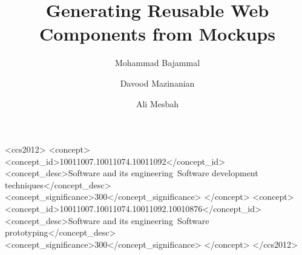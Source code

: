 \documentclass[sigconf,screen]{acmart}
\begin{document}
\title{Generating Reusable Web Components from Mockups}



%
%
%
%



\author{Mohammad Bajammal}

\author{Davood Mazinanian}

\author{Ali Mesbah}






\begin{CCSXML}
<ccs2012>
<concept>
<concept_id>10011007.10011074.10011092</concept_id>
<concept_desc>Software and its engineering~Software development techniques</concept_desc>
<concept_significance>300</concept_significance>
</concept>
<concept>
<concept_id>10011007.10011074.10011092.10010876</concept_id>
<concept_desc>Software and its engineering~Software prototyping</concept_desc>
<concept_significance>300</concept_significance>
</concept>
</ccs2012>
\end{CCSXML}

\end{document}
